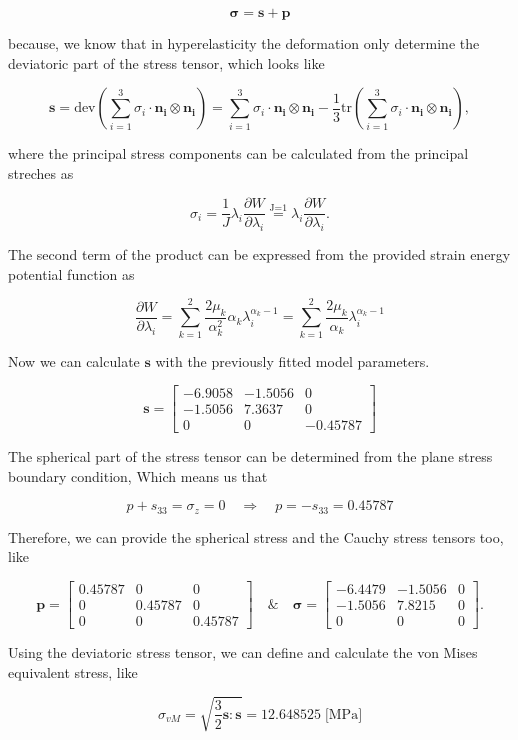 \documentclass[12pt,a4paper]{article}
\begin{document}
$$
\boldsymbol{\sigma} = \boldsymbol{s} + \boldsymbol{p}
$$

because, we know that in hyperelasticity the deformation only determine the deviatoric part of the stress tensor, which looks like

$$
\boldsymbol{s} = \text{dev}\left(\sum_{i=1}^3 \sigma_i \cdot \boldsymbol{n_i} \otimes \boldsymbol{n_i}\right) = \sum_{i=1}^3 \sigma_i \cdot \boldsymbol{n_i} \otimes \boldsymbol{n_i} - \frac{1}{3}\text{tr}\left(\sum_{i=1}^3 \sigma_i \cdot \boldsymbol{n_i} \otimes \boldsymbol{n_i}\right),
$$

where the principal stress components can be calculated from the principal streches as

$$
\sigma_i = \frac{1}{J} \lambda_i \frac{\partial W}{\partial \lambda_i} \overset{\text{J=1}}{=} \lambda_i \frac{\partial W}{\partial \lambda_i}.
$$

The second term of the product can be expressed from the provided strain energy potential function as

$$
\frac{\partial W}{\partial \lambda_i} = \sum_{k=1}^2 \frac{2\mu_k}{\alpha_k^2}\alpha_k\lambda_i^{\alpha_k-1} = 
\sum_{k=1}^2 \frac{2\mu_k}{\alpha_k}\lambda_i^{\alpha_k-1}
$$

Now we can calculate $\boldsymbol{s}$ with the previously fitted model parameters. 

$$
\boldsymbol{s} = \left[\begin{matrix}-6.9058 & -1.5056 & 0\\-1.5056 & 7.3637 & 0\\0 & 0 & -0.45787\end{matrix}\right]
$$

The spherical part of the stress tensor can be determined from the plane stress boundary condition, Which means us that

$$
p + s_{33} = \sigma_z = 0 \quad \Rightarrow \quad p = -s_{33} = 0.45787
$$

Therefore, we can provide the spherical stress and the Cauchy stress tensors too, like 

$$
\boldsymbol{p} = \left[\begin{matrix}0.45787 & 0 & 0\\0 & 0.45787 & 0\\0 & 0 & 0.45787\end{matrix}\right]
\quad\&\quad
\boldsymbol{\sigma} = \left[\begin{matrix}-6.4479 & -1.5056 & 0\\-1.5056 & 7.8215 & 0\\0 & 0 & 0\end{matrix}\right].
$$

Using the deviatoric stress tensor, we can define and calculate the von Mises equivalent stress, like

$$
\sigma_{vM} = \sqrt{\frac{3}{2}\boldsymbol{s}:\boldsymbol{s}} = 12.648525\; \text{[MPa]}
$$



\end{document}
